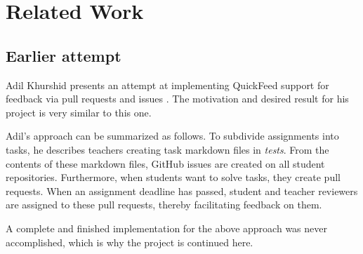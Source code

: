 
\chapter{Related Work}
\label{ch:related}

\section{Earlier attempt}

Adil Khurshid presents an attempt at implementing QuickFeed support for feedback via pull requests and issues \cite{adil}.
The motivation and desired result for his project is very similar to this one.

Adil's approach can be summarized as follows.
To subdivide assignments into tasks, he describes teachers creating task markdown files in \textit{tests}.
From the contents of these markdown files, GitHub issues are created on all student repositories.
Furthermore, when students want to solve tasks, they create pull requests.
When an assignment deadline has passed, student and teacher reviewers are assigned to these pull requests, thereby facilitating feedback on them.

A complete and finished implementation for the above approach was never accomplished, which is why the project is continued here.


